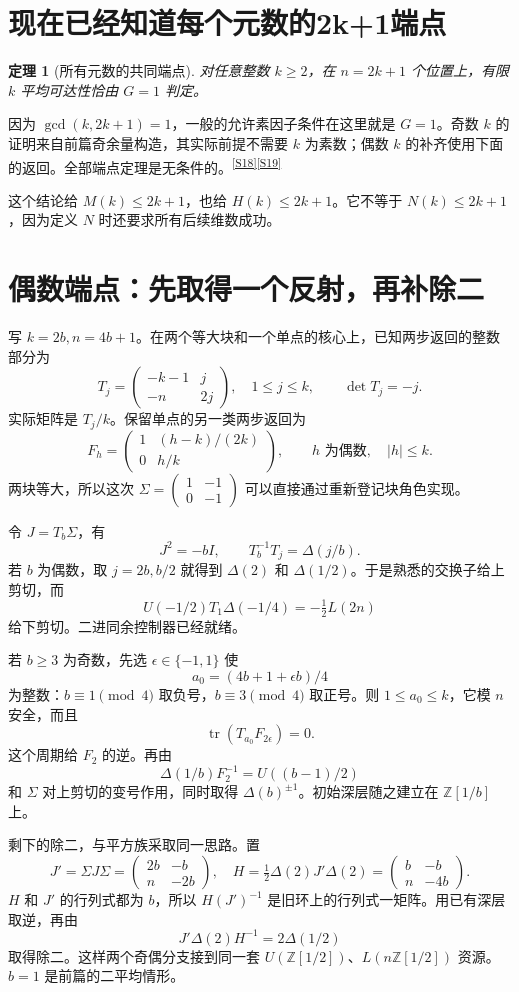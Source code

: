 \documentclass[11pt,a4paper,oneside,openany]{book}
\newcommand{\Z}{\mathbb Z}\newcommand{\Q}{\mathbb Q}\newcommand{\F}{\mathbb F}\newcommand{\CC}{\mathbb C}
\newcommand{\src}[1]{\textsuperscript{\hyperref[source:#1]{[#1]}}}
\newtheorem{theorem}{定理}[chapter]
\theoremstyle{definition}\newtheorem{example}[theorem]{例}\newtheorem{conjecture}[theorem]{猜想}
\numberwithin{equation}{chapter}\setcounter{tocdepth}{1}
\begin{document}
\section{现在已经知道每个元数的2k+1端点}
\begin{theorem}[所有元数的共同端点]
对任意整数 $k\ge2$，在 $n=2k+1$ 个位置上，有限 $k$ 平均可达性恰由 $G=1$ 判定。
\end{theorem}
因为 $\gcd(k,2k+1)=1$，一般的允许素因子条件在这里就是 $G=1$。奇数 $k$ 的证明来自前篇奇余量构造，其实际前提不需要 $k$ 为素数；偶数 $k$ 的补齐使用下面的返回。全部端点定理是无条件的。\src{S18}\src{S19}

这个结论给 $M(k)\le2k+1$，也给 $H(k)\le2k+1$。它不等于 $N(k)\le2k+1$，因为定义 $N$ 时还要求所有后续维数成功。

\section{偶数端点：先取得一个反射，再补除二}
写 $k=2b,n=4b+1$。在两个等大块和一个单点的核心上，已知两步返回的整数部分为
\[T_j=\begin{pmatrix}-k-1&j\\-n&2j\end{pmatrix},
\quad1\le j\le k,\qquad\det T_j=-j.
\]
实际矩阵是 $T_j/k$。保留单点的另一类两步返回为
\[F_h=\begin{pmatrix}1&(h-k)/(2k)\\0&h/k\end{pmatrix},
\qquad h\text{ 为偶数},\quad|h|\le k.
\]
两块等大，所以这次 $\Sigma=\left(\begin{smallmatrix}1&-1\\0&-1\end{smallmatrix}\right)$ 可以直接通过重新登记块角色实现。

令 $J=T_b\Sigma$，有
\[J^2=-bI,\qquad T_b^{-1}T_j=\Delta(j/b).
\]
若 $b$ 为偶数，取 $j=2b,b/2$ 就得到 $\Delta(2)$ 和 $\Delta(1/2)$。于是熟悉的交换子给上剪切，而
\[U(-1/2)T_1\Delta(-1/4)=-\tfrac12L(2n)
\]
给下剪切。二进同余控制器已经就绪。

若 $b\ge3$ 为奇数，先选 $\epsilon\in\{-1,1\}$ 使
\[a_0=(4b+1+\epsilon b)/4
\]
为整数：$b\equiv1\pmod4$ 取负号，$b\equiv3\pmod4$ 取正号。则 $1\le a_0\le k$，它模 $n$ 安全，而且
\[\operatorname{tr}(T_{a_0}F_{2\epsilon})=0.
\]
这个周期给 $F_2$ 的逆。再由
\[\Delta(1/b)F_2^{-1}=U((b-1)/2)
\]
和 $\Sigma$ 对上剪切的变号作用，同时取得 $\Delta(b)^{\pm1}$。初始深层随之建立在 $\Z[1/b]$ 上。

剩下的除二，与平方族采取同一思路。置
\[
J'=\Sigma J\Sigma=\begin{pmatrix}2b&-b\\n&-2b\end{pmatrix},
\quad H=\tfrac12\Delta(2)J'\Delta(2)
=\begin{pmatrix}b&-b\\n&-4b\end{pmatrix}.
\]
$H$ 和 $J'$ 的行列式都为 $b$，所以 $H(J')^{-1}$ 是旧环上的行列式一矩阵。用已有深层取逆，再由
\[J'\Delta(2)H^{-1}=2\Delta(1/2)
\]
取得除二。这样两个奇偶分支接到同一套 $U(\Z[1/2])$、$L(n\Z[1/2])$ 资源。$b=1$ 是前篇的二平均情形。
\end{document}

